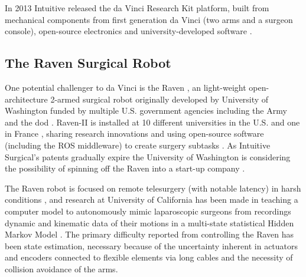 In 2013 Intuitive released the da Vinci Research Kit platform, built from mechanical components from first generation da Vinci (two arms and a surgeon console), open-source electronics and university-developed software \citep{bib:raven_observ}.

\subsection{The Raven Surgical Robot}
One potential challenger to da Vinci is the Raven \cite{bib:mddi}, an light-weight open-architecture 2-armed surgical robot \citep{bib:raven_debride,bib:raven_ii} originally developed by University of Washington funded by multiple U.S. government agencies including the Army and the \gls{dod} \citep[p 27]{bib:surgical_book}.
Raven-II is installed at 10 different universities in the U.S. and one in France \citep{bib:raven_ii}, sharing research innovations and using open-source software (including the ROS middleware) to create surgery subtasks \citep{bib:raven_debride}. 
As Intuitive Surgical's patents gradually expire the University of Washington is considering the possibility of spinning off the Raven into a start-up company \citep{bib:economist}.

The Raven robot is focused on remote telesurgery (with notable latency) in harsh conditions \citep{bib:docatadist}, and research at University of California has been made in teaching a computer model to autonomously mimic laparoscopic surgeons from recordings dynamic and kinematic data of their motions in a multi-state statistical Hidden Markov Model \citep{bib:economist}. 
The primary difficulty reported from controlling the Raven has been state estimation, necessary because of the uncertainty inherent in actuators and encoders connected to flexible elements via long cables \citep{bib:raven_debride} and the necessity of collision avoidance of the arms.



































